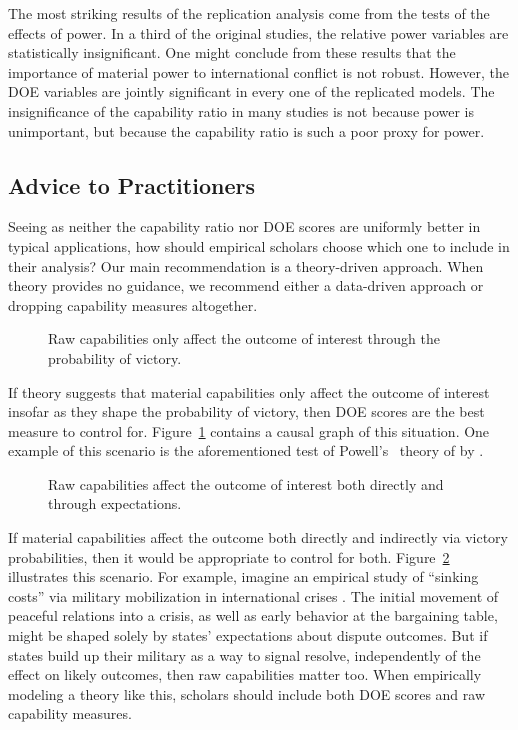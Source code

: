 The most striking results of the replication analysis come from the tests of the effects of power.
In a third of the original studies, the relative power variables are statistically insignificant.
One might conclude from these results that the importance of material power to international conflict is not robust.
However, the DOE variables are jointly significant in every one of the replicated models.
The insignificance of the capability ratio in many studies is not because power is unimportant, but because the capability ratio is such a poor proxy for power.


\subsection{Advice to Practitioners}

Seeing as neither the capability ratio nor DOE scores are uniformly better in typical applications, how should empirical scholars choose which one to include in their analysis?
Our main recommendation is a theory-driven approach.
When theory provides no guidance, we recommend either a data-driven approach or dropping capability measures altogether.

\begin{figure}[htp]
  \centering
  
  \caption{
    Raw capabilities only affect the outcome of interest through the probability of victory.
  }
  \label{fig:dag-cap0-doe1}
\end{figure}

If theory suggests that material capabilities only affect the outcome of interest insofar as they shape the probability of victory, then DOE scores are the best measure to control for.
Figure~\ref{fig:dag-cap0-doe1} contains a causal graph of this situation.
One example of this scenario is the aforementioned test of Powell's~\citeyearpar{powell1996stability,powell1999} theory of by \citet{reed2008war}.

\begin{figure}[htp]
  \centering
  
  \caption{
    Raw capabilities affect the outcome of interest both directly and through expectations.
  }
  \label{fig:dag-cap1-doe1}
\end{figure}

If material capabilities affect the outcome both directly and indirectly via victory probabilities, then it would be appropriate to control for both.
Figure~\ref{fig:dag-cap1-doe1} illustrates this scenario.
For example, imagine an empirical study of ``sinking costs'' via military mobilization in international crises \citep{fearon_signaling_1997}.
The initial movement of peaceful relations into a crisis, as well as early behavior at the bargaining table, might be shaped solely by states' expectations about dispute outcomes.
But if states build up their military as a way to signal resolve, independently of the effect on likely outcomes, then raw capabilities matter too.
When empirically modeling a theory like this, scholars should include both DOE scores and raw capability measures.

